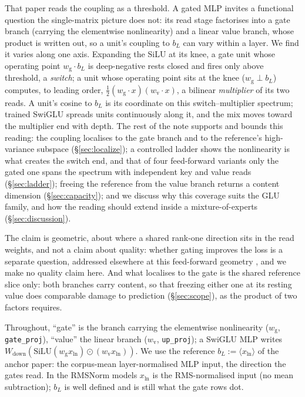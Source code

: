 \documentclass[11pt]{article}
\newcommand{\bl}{b_L}
\newcommand{\wg}{w_{\mathrm{g}}}
\newcommand{\wv}{w_{\mathrm{v}}}
\begin{document}
That paper reads the coupling as a threshold. A gated MLP invites a functional
question the single-matrix picture does not: its read stage factorises into a
gate branch (carrying the elementwise nonlinearity) and a linear value branch,
whose product is written out, so a unit's coupling to $\bl$ can vary within a
layer. We find it varies along one axis. Expanding the SiLU at its knee, a gate
unit whose operating point $\wg\!\cdot\!\bl$ is deep-negative rests closed and
fires only above threshold, a \emph{switch}; a unit whose operating point sits at
the knee ($\wg \perp \bl$) computes, to leading order,
$\tfrac{1}{2}(\wg\!\cdot\! x)(\wv\!\cdot\! x)$, a bilinear \emph{multiplier} of its
two reads. A unit's cosine to $\bl$ is its coordinate on this switch--multiplier
spectrum; trained SwiGLU spreads units continuously along it, and the mix moves
toward the multiplier end with depth. The rest of the note supports and bounds
this reading: the coupling localises to the gate branch and to the reference's
high-variance subspace (\S\ref{sec:localize}); a controlled ladder shows the
nonlinearity is what creates the switch end, and that of four feed-forward
variants only the gated one spans the spectrum with independent key and value
reads (\S\ref{sec:ladder}); freeing the reference from the value branch returns a
content dimension (\S\ref{sec:capacity}); and we discuss why this coverage suits
the GLU family, and how the reading should extend inside a mixture-of-experts
(\S\ref{sec:discussion}).

The claim is geometric, about where a
shared rank-one direction sits in the read weights, and not a claim about
quality: whether gating improves the loss is a separate question, addressed
elsewhere at this feed-forward geometry \citep{shazeer2020}, and we make no
quality claim here. And what localises to the gate is the shared reference slice
only: both branches carry content, so
that freezing either one at its resting value does comparable damage to prediction
(\S\ref{sec:scope}), as the product of two factors requires.

Throughout, ``gate'' is the branch carrying the elementwise nonlinearity
($\wg$, \texttt{gate\_proj}), ``value'' the linear branch ($\wv$,
\texttt{up\_proj}); a SwiGLU MLP writes $W_{\mathrm{down}}\!\left(\mathrm{SiLU}
(\wg x_{\mathrm{ln}})\odot(\wv x_{\mathrm{ln}})\right)$. We use the reference
$\bl := \langle x_{\mathrm{ln}}\rangle$ of the anchor paper: the corpus-mean
layer-normalised MLP input, the direction the gates read. In the RMSNorm models
$x_{\mathrm{ln}}$ is the RMS-normalised input (no mean subtraction); $\bl$ is
well defined and is still what the gate rows dot.
\end{document}
